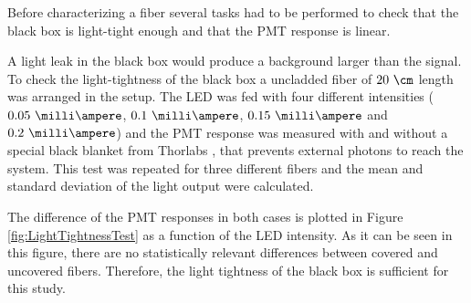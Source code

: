 
Before characterizing a fiber several tasks had to be performed to check that the black box is light-tight enough and that the PMT response is linear.


A light leak in the black box would produce a background larger than the signal. To check the light-tightness of the black box a uncladded fiber of $20~\cm$ length was arranged in the setup. The LED was fed with four different intensities ($0.05~\milli\ampere$, $0.1~\milli\ampere$, $0.15~\milli\ampere$ and $0.2~\milli\ampere$) and the PMT response was measured with and without a special black blanket from Thorlabs \cite{BlackBlancket}, that prevents external photons to reach the system. This test was repeated for three different fibers and the mean and standard deviation of the light output were calculated.


The difference of the PMT responses in both cases is plotted in Figure \ref{fig:LightTightnessTest} as a function of the LED intensity. As it can be seen in this figure, there are no statistically relevant differences between covered and uncovered fibers. Therefore, the light tightness of the black box is sufficient for this study.



